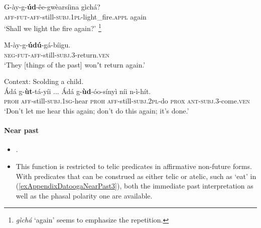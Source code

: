 \begin{exe}
	\ex\label{exAppendixDatoogaIterative1}
	\gll G-ày-g-\textbf{úd}-êe-gwèarsíina gìchá?\\
\textsc{aff}-\textsc{fut}-\textsc{aff}-still-\textsc{subj}.1\textsc{pl}-light\_fire.\textsc{appl} again\\ 
	\glt \lq Shall we light the fire again?' \parencite[429]{Mitchell2021}\footnote{\textit{gìchá} \lq again' seems to emphasize the repetition.}

	\ex\label{exAppendixDatoogaIterative2}
	\gll M-ày-g-\textbf{údú}-gá-bíigu.\\
\textsc{neg}-\textsc{fut}-\textsc{aff}-still-\textsc{subj.}3-return.\textsc{ven}\\
	\glt \lq They [things of the past] wonʼt return again.' \parencite[429]{Mitchell2021}

	\ex\label{exAppendixDatoogaIterative3} Context: Scolding a child.\\
	\gll Ádá g-\textbf{ùt}-tá-yíi ... Ádá g-\textbf{ùd}-óo-sínyì níi n-ì-hít.\\
\textsc{proh} \textsc{aff}-still-\textsc{subj}.1\textsc{sg}-hear {} \textsc{proh} \textsc{aff}-still-\textsc{subj}.2\textsc{pl}-do \textsc{prox} \textsc{ant}-\textsc{subj}.3-come.\textsc{ven}\\
	\glt \lq Don't let me hear this again; don't do this again; it's done.\rq{ }\parencite[429–430]{Mitchell2021}
\end{exe}

\paragraph{Near past}
\label{appendixDatoogaNearPast}
\begin{itemize}
	\item \textcite{Mitchell2021}.
	\item This function is restricted to telic predicates in affirmative non-future forms. With predicates that can be construed as either telic or atelic, such as \lq eat' in (\ref{exAppendixDatoogaNearPast3}), both the immediate past interpretation as well as the phasal polarity one are available.
\end{itemize}

